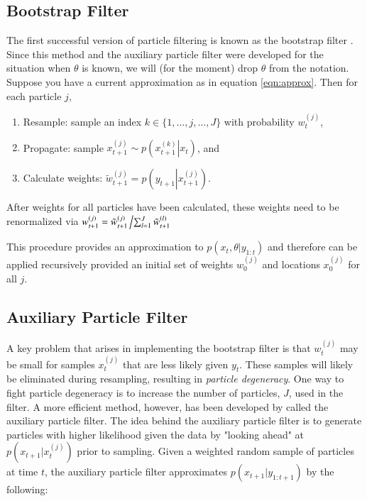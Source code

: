 \documentclass{elsarticle}
\begin{document}
\subsection{Bootstrap Filter}

The first successful version of particle filtering is known as the bootstrap filter \citep{Gord:Salm:Smit:nove:1993}. Since this method and the auxiliary particle filter were developed for the situation when $\theta$ is known, we will (for the moment) drop $\theta$ from the notation. Suppose you have a current approximation as in equation \eqref{eqn:approx}. Then for each particle $j$,

\begin{enumerate}
\item Resample: sample an index $k\in \{1,\ldots,j,\ldots,J\}$ with probability $w_t^{(j)}$,
\item Propagate: sample $x_{t+1}^{(j)} \sim p\left(\left. x_{t+1}^{(k)}\right|x_t\right)$, and
\item Calculate weights: $\tilde{w}_{t+1}^{(j)} = p\left(y_{t+1}\left|x_{t+1}^{(j)}\right.\right)$.
\end{enumerate}

\noindent After weights for all particles have been calculated, these weights need to be renormalized via $w_{t+1}^{(j)} = \tilde{w}_{t+1}^{(j)}\left/ \sum_{l=1}^J \tilde{w}_{t+1}^{(l)} \right.$

This procedure provides an approximation to $p(x_t,\theta| y_{1:t})$ and therefore can be applied recursively provided an initial set of weights $w_0^{(j)}$ and locations $x_0^{(j)}$ for all $j$.

\subsection{Auxiliary Particle Filter}

A key problem that arises in implementing the bootstrap filter is that $w_t^{(j)}$ may be small for samples $x_t^{(j)}$ that are less likely given $y_t$. These samples will likely be eliminated during resampling, resulting in \emph{particle degeneracy}. One way to fight particle degeneracy is to increase the number of particles, $J$, used in the filter. A more efficient method, however, has been developed by \citet{Pitt:Shep:filt:1999} called the auxiliary particle filter.  The idea behind the auxiliary particle filter is to generate particles with higher likelihood given the data by "looking ahead" at $p(x_{t+1}|x_t^{(j)})$ prior to sampling. Given a weighted random sample of particles at time $t$, the auxiliary particle filter approximates $p(x_{t+1}|y_{1:t+1})$ by the following:
\end{document}

